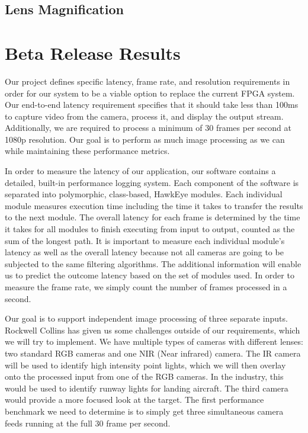 \documentclass[letterpaper,10pt,titlepage]{IEEEtran}
\begin{document}
   \subsection{Lens Magnification}
   
\section{Beta Release Results}
   Our project defines specific latency, frame rate, and resolution requirements in order for our system to be a viable option to replace the current FPGA system. Our end-to-end latency requirement specifies that it should take less than 100ms to capture video from the camera, process it, and display the output stream. Additionally, we are required to process a minimum of 30 frames per second at 1080p resolution. Our goal is to perform as much image processing as we can while maintaining these performance metrics.\\
\par
In order to measure the latency of our application, our software contains a detailed, built-in performance logging system. Each component of the software is separated into polymorphic, class-based, HawkEye modules. Each individual module measures execution time including the time it takes to transfer the results to the next module. The overall latency for each frame is determined by the time it takes for all modules to finish executing from input to output, counted as the sum of the longest path. It is important to measure each individual module's latency as well as the overall latency because not all cameras are going to be subjected to the same filtering algorithms. The additional information will enable us to predict the outcome latency based on the set of modules used. In order to measure the frame rate, we simply count the number of frames processed in a second.\\
\par
Our goal is to support independent image processing of three separate inputs. Rockwell Collins has given us some challenges outside of our requirements, which we will try to implement. We have multiple types of cameras with different lenses: two standard RGB cameras and one NIR (Near infrared) camera. The IR camera will be used to identify high intensity point lights, which we will then overlay onto the processed input from one of the RGB cameras. In the industry, this would be used to identify runway lights for landing aircraft. The third camera would provide a more focused look at the target. The first performance benchmark we need to determine is to simply get three simultaneous camera feeds running at the full 30 frame per second.\\
\end{document}
